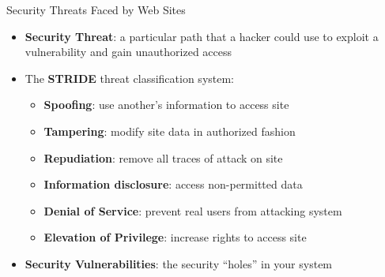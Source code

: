 \documentclass[14pt,aspectratio=169]{beamer}
\begin{document}
%
\begin{frame}{Security Threats Faced by Web Sites}
  \begin{itemize}
    \item {\bf Security Threat}: a particular path that a hacker could use to
      exploit a vulnerability and gain unauthorized access
      \vspace*{-.15in}
    \item The {\bf STRIDE} threat classification system:
      \begin{itemize}
        \item {\bf Spoofing}: use another's information to access site
        \item {\bf Tampering}: modify site data in authorized fashion
        \item {\bf Repudiation}: remove all traces of attack on site
        \item {\bf Information disclosure}: access non-permitted data
        \item {\bf Denial of Service}: prevent real users from attacking system
        \item {\bf Elevation of Privilege}: increase rights to access site
      \end{itemize}
      \vspace*{-.25in}
    \item {\bf Security Vulnerabilities}: the security ``holes'' in your system 
  \end{itemize}
\end{frame}
\end{document}
